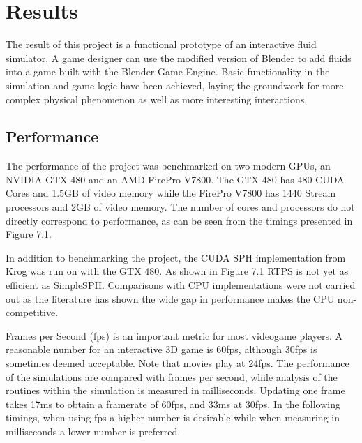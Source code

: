 \chapter{Results}

The result of this project is a functional prototype of an interactive fluid
simulator. A game designer can use the modified version of Blender to add
fluids into a game built with the Blender Game Engine. Basic functionality in
the simulation and game logic have been achieved, laying the groundwork for
more complex physical phenomenon as well as more interesting interactions.


\section{Performance}
    
The performance of the project was benchmarked on two modern GPUs, an NVIDIA
GTX 480 and an AMD FirePro V7800. The GTX 480 has 480 CUDA Cores and 1.5GB of
video memory while the FirePro V7800 has 1440 Stream processors and 2GB of
video memory. The number of cores and processors do not directly correspond to
performance, as can be seen from the timings presented in Figure 7.1.


In addition to benchmarking the project, the CUDA SPH implementation from
Krog\cite{Krog2010} was run on with the GTX 480. As shown in Figure 7.1 RTPS is
not yet as efficient as SimpleSPH. Comparisons with CPU implementations were
not carried out as the literature has shown the wide gap in performance makes
the CPU non-competitive.\cite{Hoetzlein}\cite{Krog2010}

Frames per Second (fps) is an important metric for most videogame players.  A
reasonable number for an interactive 3D game is 60fps, although 30fps is
sometimes deemed acceptable. Note that movies play at 24fps. The performance of
the simulations are compared with frames per second, while analysis of the
routines within the simulation is measured in milliseconds. Updating one frame
takes 17ms to obtain a framerate of 60fps, and 33ms at 30fps. In the following
timings, when using fps a higher number is desirable while when measuring in
milliseconds a lower number is preferred.

\pagebreak


